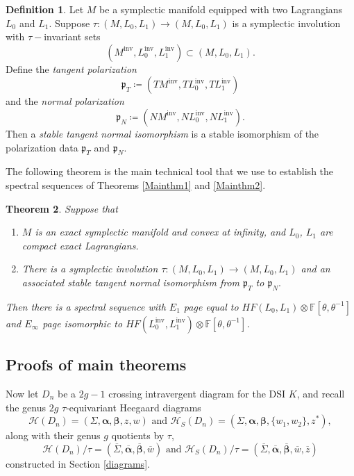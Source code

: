 \documentclass[11pt]{amsart}
\newtheorem{theorem}{Theorem}[section]
\theoremstyle{definition}
\newtheorem{definition}[theorem]{Definition}
\theoremstyle{remark}
\def\F{\mathbb{F}}
\newcommand{\M}{M^{\operatorname{inv}}}
\newcommand{\Lo}{L_0^{\operatorname{inv}}}
\newcommand{\Li}{L_1^{\operatorname{inv}}}
\numberwithin{equation}{section}
\begin{document}
\begin{definition}
   Let $M$ be a symplectic manifold equipped with two Lagrangians $L_0$ and $L_1$. Suppose $\tau\colon (M,L_0,L_1)\to(M,L_0,L_1)$ is a symplectic involution with $\tau-$invariant sets \[(\M,\Lo,\Li)\subset(M,L_0,L_1).\] Define the \emph{tangent polarization} \begin{equation}
    \mathfrak{p}_T\coloneq (T\M,T\Lo,T\Li)
\end{equation} and the \emph{normal polarization} \begin{equation}\mathfrak{p}_N\coloneq (N\M,N\Lo,N\Li).\end{equation} Then a \emph{stable tangent normal isomorphism} is a stable isomorphism of the polarization data $\mathfrak{p}_T$ and $\mathfrak{p}_N$.
\end{definition}
The following theorem is the main technical tool that we use to establish the spectral sequences of Theorems \ref{Mainthm1} and \ref{Mainthm2}.
\begin{theorem}\label{Largelocal}
    Suppose that 
    \begin{enumerate}
        \item $M$ is an exact symplectic manifold and convex at infinity, and $L_0$, $L_1$ are compact exact Lagrangians.
        \item There is a symplectic involution $\tau\colon (M,L_0,L_1)\to(M,L_0,L_1)$ and an associated stable tangent normal isomorphism from $\mathfrak{p}_T$ to $\mathfrak{p}_N.$

    \end{enumerate}
Then there is a spectral sequence with $E_1$ page equal to $HF(L_0,L_1)\otimes\F[\theta,\theta^{-1}]$ and $E_\infty$ page isomorphic to $HF(\Lo, \Li)\otimes\F[\theta,\theta^{-1}]$. 
\end{theorem}









\subsection{Proofs of main theorems}\label{mainthmsection}




Now let $D_n$ be a $2g-1$ crossing intravergent diagram for the DSI $K$, and recall the genus $2g$ $\tau$-equivariant Heegaard diagrams \[\mathcal{H}(D_n)=(\Sigma,\bm{\alpha},\bm{\beta},z,w) \textrm{ and } \mathcal{H}_S(D_n)=(\Sigma,\bm{\alpha},\bm{\beta},\{w_1,w_2\},z^*),\] along with their genus $g$ quotients by $\tau$,
\[\mathcal{H}(D_n)/\tau=(\overline{\Sigma},\overline{\bm{\alpha}},\overline{\bm{\beta}},\overline{w}) \textrm{ and } \mathcal{H}_S(D_n)/\tau=(\overline{\Sigma},\overline{\bm{\alpha}},\overline{\bm{\beta}},\overline{w},\overline{z})\]constructed in Section \ref{diagrams}.
\end{document}
